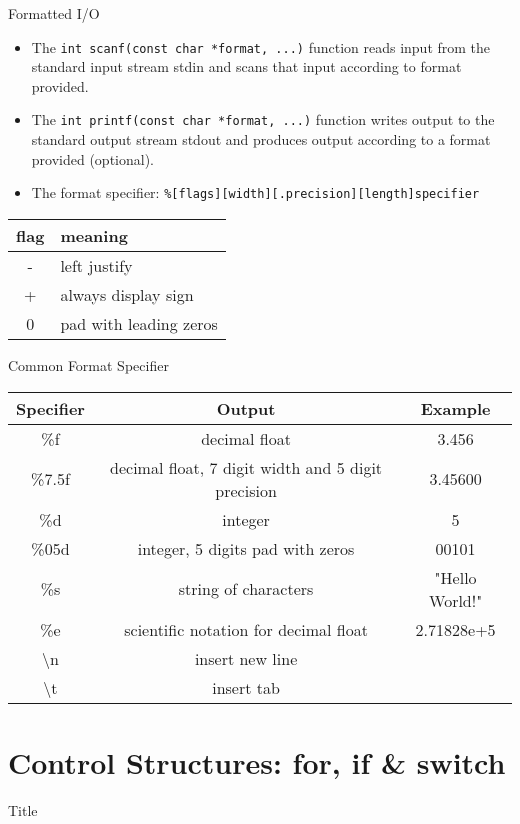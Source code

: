 \documentclass[10pt,t]{beamer}
\begin{document}
\begin{frame}[fragile]{Formatted I/O}
  \begin{itemize}
    \item The \lstinline|int scanf(const char *format, ...)| function reads input from the standard input stream stdin and scans that input according to format provided.
    \item The \lstinline|int printf(const char *format, ...)| function writes output to the standard output stream stdout and produces output according to a format provided (optional).
      
    \item The format specifier: \lstinline|%[flags][width][.precision][length]specifier| 
  \end{itemize}
  \begin{center}
    \begin{tabular}{cl}
      \hline
      flag & meaning \\
      \hline
      - & left justify \\
      + & always display sign\\
      0 & pad with leading zeros\\
      \hline
    \end{tabular}
  \end{center}
\end{frame}

\begin{frame}{Common Format Specifier}
  \begin{center}
    \begin{tabular}{|c|c|c|}
      \hline
      Specifier & Output & Example\\
      \hline
      \%f & decimal float & 3.456 \\
      \hline
      \%7.5f & decimal float, 7 digit width and 5 digit precision & 3.45600 \\
      \hline
      \%d & integer & 5\\
      \hline
      \%05d & integer, 5 digits pad with zeros & 00101 \\
      \hline
      \%s & string of characters & "Hello World!"\\
      \hline
      \%e & scientific notation for decimal float & 2.71828e+5  \\
      \hline
      \textbackslash{}n & insert new line & \\
      \hline
      \textbackslash{}t & insert tab & \\
      \hline
    \end{tabular}
  \end{center}
\end{frame}

\section{Control Structures: for, if \& switch}
\begin{frame}{Title}

\end{frame}
\end{document}
